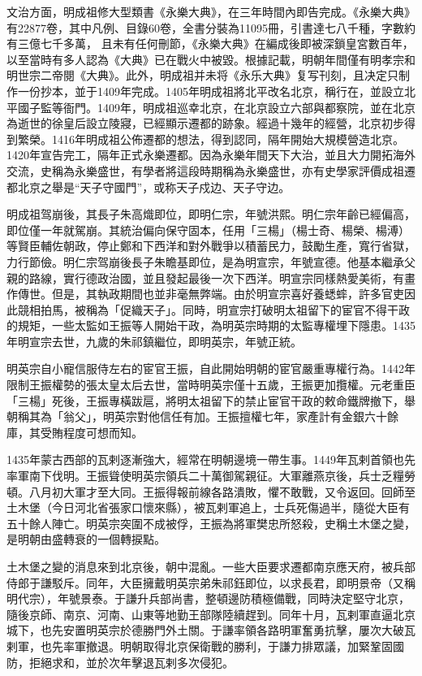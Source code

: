 文治方面，明成祖修大型類書《永樂大典》，在三年時間內即告完成。《永樂大典》有22877卷，其中凡例、目錄60卷，全書分裝為11095冊，引書達七八千種，字數約有三億七千多萬， 且未有任何刪節，《永樂大典》在編成後即被深鎖皇宮數百年，以至當時有多人認為《大典》已在戰火中被毀。根據記載，明朝年間僅有明孝宗和明世宗二帝閱《大典》。此外，明成祖并未将《永乐大典》复写刊刻，且决定只制作一份抄本，並于1409年完成。1405年明成祖將北平改名北京，稱行在，並設立北平國子監等衙門。1409年，明成祖巡幸北京，在北京設立六部與都察院，並在北京為逝世的徐皇后設立陵寢，已經顯示遷都的跡象。經過十幾年的經營，北京初步得到繁榮。1416年明成祖公佈遷都的想法，得到認同，隔年開始大規模營造北京。1420年宣告完工，隔年正式永樂遷都。因為永樂年間天下大治，並且大力開拓海外交流，史稱為永樂盛世，有學者將這段時期稱為永樂盛世，亦有史學家評價成祖遷都北京之舉是“天子守國門”，或称天子戍边、天子守边。

明成祖驾崩後，其長子朱高熾即位，即明仁宗，年號洪熙。明仁宗年齡已經偏高，即位僅一年就駕崩。其統治偏向保守固本，任用「三楊」（楊士奇、楊榮、楊溥）等賢臣輔佐朝政，停止鄭和下西洋和對外戰爭以積蓄民力，鼓勵生產，寬行省獄，力行節儉。明仁宗驾崩後長子朱瞻基即位，是為明宣宗，年號宣德。他基本繼承父親的路線，實行德政治國，並且發起最後一次下西洋。明宣宗同樣熱愛美術，有畫作傳世。但是，其執政期間也並非毫無弊端。由於明宣宗喜好養蟋蟀，許多官吏因此競相拍馬，被稱為「促織天子」。同時，明宣宗打破明太祖留下的宦官不得干政的規矩，一些太監如王振等人開始干政，為明英宗時期的太監專權埋下隱患。1435年明宣宗去世，九歲的朱祁鎮繼位，即明英宗，年號正統。

明英宗自小寵信服侍左右的宦官王振，自此開始明朝的宦官嚴重專權行為。1442年限制王振權勢的張太皇太后去世，當時明英宗僅十五歲，王振更加攬權。元老重臣「三楊」死後，王振專橫跋扈，將明太祖留下的禁止宦官干政的敕命鐵牌撤下，舉朝稱其為「翁父」，明英宗對他信任有加。王振擅權七年，家產計有金銀六十餘庫，其受賄程度可想而知。

1435年蒙古西部的瓦剌逐漸強大，經常在明朝邊境一帶生事。1449年瓦剌首領也先率軍南下伐明。王振聳使明英宗領兵二十萬御駕親征。大軍離燕京後，兵士乏糧勞頓。八月初大軍才至大同。王振得報前線各路潰敗，懼不敢戰，又令返回。回師至土木堡（今日河北省張家口懷來縣），被瓦剌軍追上，士兵死傷過半，隨從大臣有五十餘人陣亡。明英宗突圍不成被俘，王振為將軍樊忠所怒殺，史稱土木堡之變，是明朝由盛轉衰的一個轉捩點。

土木堡之變的消息來到北京後，朝中混亂。一些大臣要求遷都南京應天府，被兵部侍郎于謙駁斥。同年，大臣擁戴明英宗弟朱祁鈺即位，以求長君，即明景帝（又稱明代宗），年號景泰。于謙升兵部尚書，整頓邊防積極備戰，同時決定堅守北京，隨後京師、南京、河南、山東等地勤王部隊陸續趕到。同年十月，瓦剌軍直逼北京城下，也先安置明英宗於德勝門外土關。于謙率領各路明軍奮勇抗擊，屢次大破瓦剌軍，也先率軍撤退。明朝取得北京保衛戰的勝利，于謙力排眾議，加緊鞏固國防，拒絕求和，並於次年擊退瓦剌多次侵犯。

